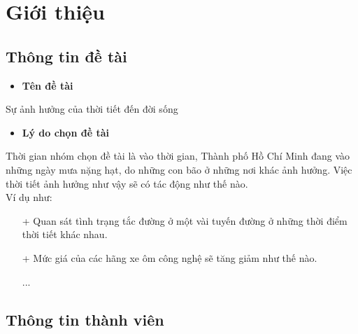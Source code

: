 

\section{Giới thiệu}
\subsection{Thông tin đề tài}
\begin{itemize}
    \item \textbf{Tên đề tài}
\end{itemize}
Sự ảnh hưởng của thời tiết đến đời sống
\begin{itemize}
    \item \textbf{Lý do chọn đề tài}
\end{itemize}

Thời gian nhóm chọn đề tài là vào thời gian, Thành phố Hồ Chí Minh đang vào những ngày mưa nặng hạt, do những con bão ở những nơi khác ảnh hưởng. Việc thời tiết ảnh hưởng như vậy sẽ có tác động như thế nào.\\[0.5mm]

Ví dụ như:
\begin{itemize}
    \item[+]Quan sát tình trạng tắc đường ở một vài tuyến đường ở những thời điểm thời tiết khác nhau.
    \item[+]Mức giá của các hãng xe ôm công nghệ sẽ tăng giảm như thế nào.

          ...
\end{itemize}

\subsection{Thông tin thành viên}

\def\Fjob{3}
\def\Sjob{3}
\def\Tjob{3}

